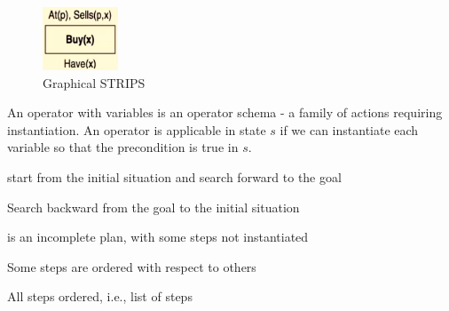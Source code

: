 \documentclass[a4paper]{article}
\theoremstyle{plain}
\theoremstyle{definition}
\newtheorem{defn}{Definition}[section]
\theoremstyle{remark}
\begin{document}
\begin{figure}[H]
	\centering
	\includegraphics[width=0.2\textwidth]{thirteen.png}
	\caption{Graphical STRIPS}
	\label{fig:thirteen-png}
\end{figure}
An operator with variables is an operator schema - a family of actions requiring instantiation. An operator is applicable in state $s$ if we can instantiate each variable so that the precondition is true in $s$.
\begin{tcolorbox}[colback=black!3!white,colframe=black!60!white,title=\begin{defn}Progression \label{Progression}\end{defn}]
start from the initial situation and search forward to the goal
\end{tcolorbox}
\begin{tcolorbox}[colback=black!3!white,colframe=black!60!white,title=\begin{defn}Regression \label{Regression}\end{defn}]
Search backward from the goal to the initial situation
\end{tcolorbox}
\begin{tcolorbox}[colback=black!3!white,colframe=black!60!white,title=\begin{defn}Partial Plan \label{Partial Plan}\end{defn}]
is an incomplete plan, with some steps not instantiated
\end{tcolorbox}
\begin{tcolorbox}[colback=black!3!white,colframe=black!60!white,title=\begin{defn}Partial order \label{Partial order}\end{defn}]
Some steps are ordered with respect to others
\end{tcolorbox}
\begin{tcolorbox}[colback=black!3!white,colframe=black!60!white,title=\begin{defn}Total order \label{Total order}\end{defn}]
All steps ordered, i.e., list of steps
\end{tcolorbox}
\end{document}
